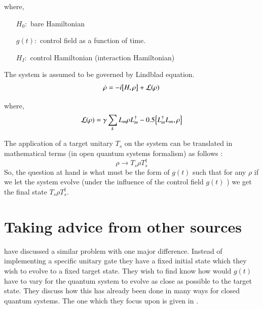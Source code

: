 where,
\begin{enumerate}
    \item[$H_{0} :$] bare Hamiltonian
    \item[$ g(t) :$] control field as a function of time.
    \item[$ H _{ I} :$] control Hamiltonian (interaction Hamiltonian)
\end{enumerate}

The system is assumed to be governed by Lindblad equation.
\begin{align}
    \dot{\rho} = - i\comm{H}{\rho} + \mathcal{L}(\rho)
\end{align}

where,
\[
 \mathcal{L}(\rho) = \gamma\sum_{k} L_{m} \rho L_{m}^{\dagger} - 0.5 \anticommutator{L_{m}^{\dagger}L_{m}}{ \rho}
\]

The application of a target unitary $T_{s} $ on the system can be translated in mathematical terms (in open quantum systems formalism) as follows :
\[
 \rho \rightarrow T_{s}  \rho T_{s} ^{\dagger}
\]
So, the question at hand is what must be the form of $ g (t)$
 such that for any $\rho $ if we let the system evolve (under the influence of the  control field  $g (t) $ ) we get the final state $T_{s} \rho  T_{s} ^{\dagger}$.

\section{Taking advice from other sources}
\cite{2018EPJST.227..203S} have  discussed a similar problem with one major difference. Instead of implementing a specific unitary gate they have a fixed initial state which they wish to evolve to a fixed target state.  They wish to find know how would $ g(t)$ have to vary for the quantum system to evolve as close as possible to the target state. They discuss how this has already been done in many ways for closed quantum systems. The one which they focus upon is given in \cite{2012JChPh.136j4103R}.


